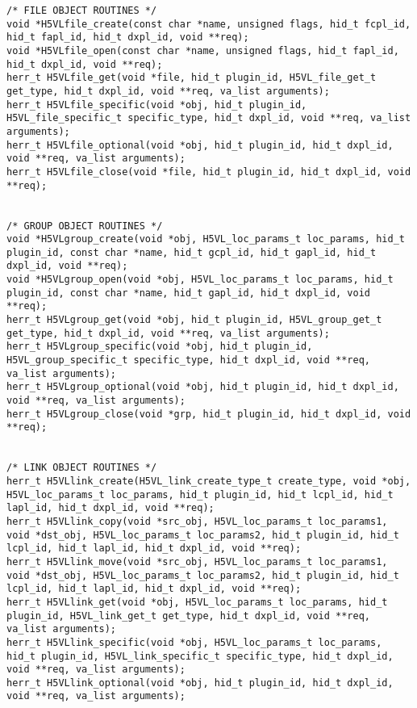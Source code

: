 \begin{appendices}
\begin{lstlisting}
/* FILE OBJECT ROUTINES */
void *H5VLfile_create(const char *name, unsigned flags, hid_t fcpl_id, hid_t fapl_id, hid_t dxpl_id, void **req);
void *H5VLfile_open(const char *name, unsigned flags, hid_t fapl_id, hid_t dxpl_id, void **req);
herr_t H5VLfile_get(void *file, hid_t plugin_id, H5VL_file_get_t get_type, hid_t dxpl_id, void **req, va_list arguments);
herr_t H5VLfile_specific(void *obj, hid_t plugin_id, H5VL_file_specific_t specific_type, hid_t dxpl_id, void **req, va_list arguments);
herr_t H5VLfile_optional(void *obj, hid_t plugin_id, hid_t dxpl_id, void **req, va_list arguments);
herr_t H5VLfile_close(void *file, hid_t plugin_id, hid_t dxpl_id, void **req);


/* GROUP OBJECT ROUTINES */
void *H5VLgroup_create(void *obj, H5VL_loc_params_t loc_params, hid_t plugin_id, const char *name, hid_t gcpl_id, hid_t gapl_id, hid_t dxpl_id, void **req);
void *H5VLgroup_open(void *obj, H5VL_loc_params_t loc_params, hid_t plugin_id, const char *name, hid_t gapl_id, hid_t dxpl_id, void **req);
herr_t H5VLgroup_get(void *obj, hid_t plugin_id, H5VL_group_get_t get_type, hid_t dxpl_id, void **req, va_list arguments);
herr_t H5VLgroup_specific(void *obj, hid_t plugin_id, H5VL_group_specific_t specific_type, hid_t dxpl_id, void **req, va_list arguments);
herr_t H5VLgroup_optional(void *obj, hid_t plugin_id, hid_t dxpl_id, void **req, va_list arguments);
herr_t H5VLgroup_close(void *grp, hid_t plugin_id, hid_t dxpl_id, void **req);


/* LINK OBJECT ROUTINES */
herr_t H5VLlink_create(H5VL_link_create_type_t create_type, void *obj, H5VL_loc_params_t loc_params, hid_t plugin_id, hid_t lcpl_id, hid_t lapl_id, hid_t dxpl_id, void **req);
herr_t H5VLlink_copy(void *src_obj, H5VL_loc_params_t loc_params1, void *dst_obj, H5VL_loc_params_t loc_params2, hid_t plugin_id, hid_t lcpl_id, hid_t lapl_id, hid_t dxpl_id, void **req);
herr_t H5VLlink_move(void *src_obj, H5VL_loc_params_t loc_params1, void *dst_obj, H5VL_loc_params_t loc_params2, hid_t plugin_id, hid_t lcpl_id, hid_t lapl_id, hid_t dxpl_id, void **req);
herr_t H5VLlink_get(void *obj, H5VL_loc_params_t loc_params, hid_t plugin_id, H5VL_link_get_t get_type, hid_t dxpl_id, void **req, va_list arguments);
herr_t H5VLlink_specific(void *obj, H5VL_loc_params_t loc_params, hid_t plugin_id, H5VL_link_specific_t specific_type, hid_t dxpl_id, void **req, va_list arguments);
herr_t H5VLlink_optional(void *obj, hid_t plugin_id, hid_t dxpl_id, void **req, va_list arguments);



\end{lstlisting}
\end{appendices}
